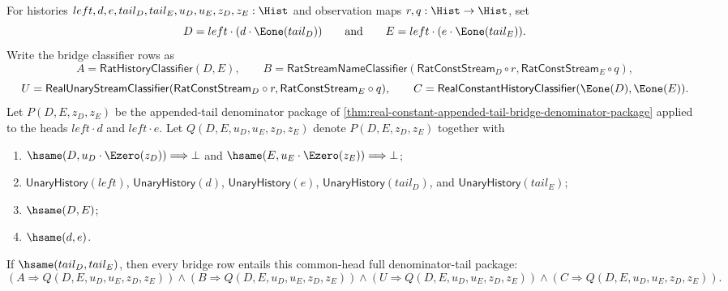 \begin{theorem}
\label{thm:real-constant-appended-tail-bridge-common-head-full-denominator-tail-package}
For histories $left,d,e,tail_D,tail_E,u_D,u_E,z_D,z_E:\Hist$ and observation
maps $r,q:\Hist\to\Hist$, set
$$
D=left\cdot(d\cdot\Eone(tail_D))
\qquad\text{and}\qquad
E=left\cdot(e\cdot\Eone(tail_E)).
$$
Write the bridge classifier rows as
$$
A=\mathsf{RatHistoryClassifier}(D,E),
\qquad
B=\mathsf{RatStreamNameClassifier}(\mathsf{RatConstStream}_D\circ r,
\mathsf{RatConstStream}_E\circ q),
$$
$$
U=\mathsf{RealUnaryStreamClassifier}(\mathsf{RatConstStream}_D\circ r,
\mathsf{RatConstStream}_E\circ q),
\qquad
C=\mathsf{RealConstantHistoryClassifier}(\Eone(D),\Eone(E)).
$$
Let $P(D,E,z_D,z_E)$ be the appended-tail denominator package of
\autoref{thm:real-constant-appended-tail-bridge-denominator-package} applied to
the heads $left\cdot d$ and $left\cdot e$. Let
$Q(D,E,u_D,u_E,z_D,z_E)$ denote $P(D,E,z_D,z_E)$ together with
\begin{enumerate}
  \item $\hsame(D,u_D\cdot\Ezero(z_D))\Longrightarrow\bot$ and
  $\hsame(E,u_E\cdot\Ezero(z_E))\Longrightarrow\bot$;
  \item $\mathsf{UnaryHistory}(left)$, $\mathsf{UnaryHistory}(d)$,
  $\mathsf{UnaryHistory}(e)$, $\mathsf{UnaryHistory}(tail_D)$, and
  $\mathsf{UnaryHistory}(tail_E)$;
  \item $\hsame(D,E)$;
  \item $\hsame(d,e)$.
\end{enumerate}
If $\hsame(tail_D,tail_E)$, then every bridge row entails this common-head full
denominator-tail package:
$$
(A\Longrightarrow Q(D,E,u_D,u_E,z_D,z_E))\land
(B\Longrightarrow Q(D,E,u_D,u_E,z_D,z_E))\land
(U\Longrightarrow Q(D,E,u_D,u_E,z_D,z_E))\land
(C\Longrightarrow Q(D,E,u_D,u_E,z_D,z_E)).
$$
\end{theorem}
